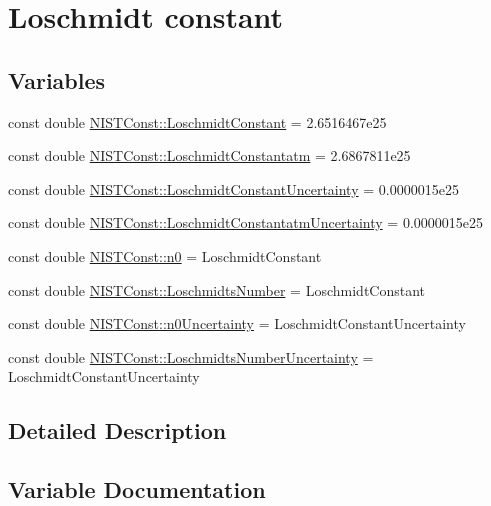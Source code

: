 \hypertarget{group___loschmidt_constant}{}\section{Loschmidt constant}
\label{group___loschmidt_constant}
\subsection*{Variables}
\begin{DoxyCompactItemize}
\item 
const double \hyperlink{group___loschmidt_constant_gab4ddc03e855109d251efa0ae9e8fb80d}{N\+I\+S\+T\+Const\+::\+Loschmidt\+Constant} = 2.\+6516467e25
\item 
const double \hyperlink{group___loschmidt_constant_ga1442f26c5c9f899f74ef7b546a41c461}{N\+I\+S\+T\+Const\+::\+Loschmidt\+Constantatm} = 2.\+6867811e25
\item 
const double \hyperlink{group___loschmidt_constant_gae1bf8845a08d0554f1045083a143c30a}{N\+I\+S\+T\+Const\+::\+Loschmidt\+Constant\+Uncertainty} = 0.\+0000015e25
\item 
const double \hyperlink{group___loschmidt_constant_gaed8885c8d2d27d9d8b88c271e0022228}{N\+I\+S\+T\+Const\+::\+Loschmidt\+Constantatm\+Uncertainty} = 0.\+0000015e25
\item 
const double \hyperlink{group___loschmidt_constant_ga95b0a12ed1a4d5aa9f05a08927be123c}{N\+I\+S\+T\+Const\+::n0} = Loschmidt\+Constant
\item 
const double \hyperlink{group___loschmidt_constant_gaf6143a6202718104ded1b92da2a0217f}{N\+I\+S\+T\+Const\+::\+Loschmidts\+Number} = Loschmidt\+Constant
\item 
const double \hyperlink{group___loschmidt_constant_gab05aaddbc9cb5a104a42cc83ab752d78}{N\+I\+S\+T\+Const\+::n0\+Uncertainty} = Loschmidt\+Constant\+Uncertainty
\item 
const double \hyperlink{group___loschmidt_constant_gab851db21b311f09798d0df42d2e25f3f}{N\+I\+S\+T\+Const\+::\+Loschmidts\+Number\+Uncertainty} = Loschmidt\+Constant\+Uncertainty
\end{DoxyCompactItemize}


\subsection{Detailed Description}


\subsection{Variable Documentation}
\mbox{\label{group___loschmidt_constant_gab4ddc03e855109d251efa0ae9e8fb80d}} 

